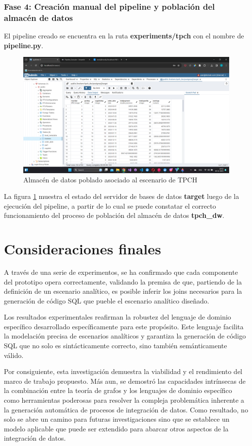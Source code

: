 \subsubsection{Fase 4: Creaci\'on manual del pipeline y poblaci\'on del almac\'en de datos}

El pipeline creado se encuentra en la ruta \textbf{experiments/tpch} con el nombre de 
\textbf{pipeline.py}. 

\begin{figure}[H]
  \centering
  \includegraphics[scale=0.4]{Graphics/fullpgadmin2.png}
  \caption{Almacén de datos poblado asociado al escenario de TPCH}
  \label{fig:fullpg2}
\end{figure}

La figura \ref{fig:fullpg2} muestra el estado del servidor de bases de datos \textbf{target} luego de la ejecuci\'on 
del pipeline, a partir de lo cual se puede constatar el correcto funcionamiento del proceso de población 
del almac\'en de datos \textbf{tpch\_dw}.

\section{Consideraciones finales}\label{section:finalconsiderations}

A través de una serie de experimentos, se ha confirmado que cada componente del prototipo 
opera correctamente, validando la premisa de que, partiendo de la definición de un escenario analítico, 
es posible inferir los joins necesarios para la generación de código SQL que pueble 
el escenario analítico diseñado.

Los resultados experimentales reafirman la robustez del lenguaje de dominio específico desarrollado 
específicamente para este propósito. Este lenguaje facilita la modelación precisa de escenarios analíticos y 
garantiza la generación de código SQL que no solo es sintácticamente correcto, sino también semánticamente v\'alido.

Por consiguiente, esta investigación demuestra la viabilidad y el rendimiento del marco de trabajo propuesto. 
Más aun, se demostr\'o las capacidades intrínsecas de la combinación entre la teoría de grafos y los lenguajes de 
dominio específico como herramientas poderosas para resolver la compleja problemática inherente a la generación 
automática de procesos de integración de datos. Como resultado, no solo se abre un camino para futuras 
investigaciones sino que se establece un modelo aplicable que puede ser extendido para abarcar otros 
aspectos de la integración de datos. 
